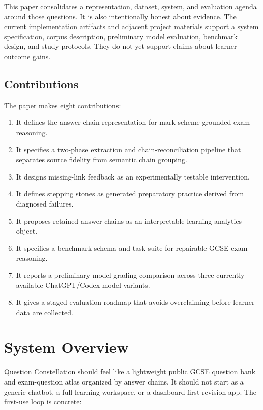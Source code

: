 \documentclass[11pt]{article}
\begin{document}
This paper consolidates a representation, dataset, system, and evaluation agenda around those questions. It is also intentionally honest about evidence. The current implementation artifacts and adjacent project materials support a system specification, corpus description, preliminary model evaluation, benchmark design, and study protocols. They do not yet support claims about learner outcome gains.

\subsection{Contributions}

The paper makes eight contributions:

\begin{enumerate}
\item It defines the answer-chain representation for mark-scheme-grounded exam reasoning.
\item It specifies a two-phase extraction and chain-reconciliation pipeline that separates source fidelity from semantic chain grouping.
\item It designs missing-link feedback as an experimentally testable intervention.
\item It defines stepping stones as generated preparatory practice derived from diagnosed failures.
\item It proposes retained answer chains as an interpretable learning-analytics object.
\item It specifies a benchmark schema and task suite for repairable GCSE exam reasoning.
\item It reports a preliminary model-grading comparison across three currently available ChatGPT/Codex model variants.
\item It gives a staged evaluation roadmap that avoids overclaiming before learner data are collected.
\end{enumerate}

\section{System Overview}

Question Constellation should feel like a lightweight public GCSE question bank and exam-question atlas organized by answer chains. It should not start as a generic chatbot, a full learning workspace, or a dashboard-first revision app. The first-use loop is concrete:

\begin{center}
\end{center}
\end{document}
